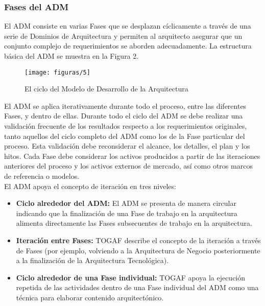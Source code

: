   \subsubsection{Fases del ADM}
  El ADM consiste en varias Fases que se desplazan cíclicamente a través de una serie de Dominios de Arquitectura y permiten al arquitecto asegurar que un conjunto complejo de requerimientos se aborden adecuadamente. La estructura básica del ADM se muestra en la Figura 2.
  
    \begin{figure}[H]
    	\centering
    	\texttt{[image: figuras/5]}
    	\captionsetup{width=.95\textwidth}
    	\caption{El ciclo del Modelo de Desarrollo de la Arquitectura}
    	\label{figura5}
    \end{figure}
    
    El ADM se aplica iterativamente durante todo el proceso, entre las diferentes Fases, y dentro de ellas. Durante todo el ciclo del ADM se debe realizar una validación frecuente de los resultados respecto a los requerimientos originales, tanto aquellos del ciclo completo del ADM como los de la Fase particular del proceso. Esta validación debe reconsiderar el alcance, los detalles, el plan y los hitos. Cada Fase debe considerar los activos producidos a partir de las iteraciones anteriores del proceso y los activos externos de mercado, así como otros marcos de referencia o modelos. \\
    
    El ADM apoya el concepto de iteración en tres niveles:
    \begin{itemize}
    	\item \textbf{Ciclo alrededor del ADM:} El ADM se presenta de manera circular indicando que la finalización de una Fase de trabajo en la arquitectura alimenta directamente las Fases subsecuentes de trabajo en la arquitectura.
    	\item \textbf{Iteración entre Fases:} TOGAF describe el concepto de la iteración a través de Fases (por ejemplo, volviendo a la Arquitectura de Negocio posteriormente a la finalización de la Arquitectura Tecnológica).
    	\item \textbf{Ciclo alrededor de una Fase individual:} TOGAF apoya la ejecución repetida de las actividades dentro de una Fase individual del ADM como una técnica para elaborar contenido arquitectónico.
   \end{itemize}
   

